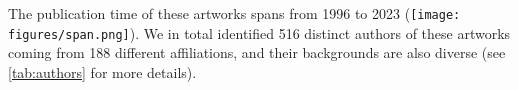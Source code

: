 The publication time of these artworks spans from 1996 to 2023 (\texttt{[image: figures/span.png]}).
We in total identified 516 distinct authors of these artworks coming from 188 different affiliations, and their backgrounds are also diverse (see \autoref{tab:authors} for more details).
